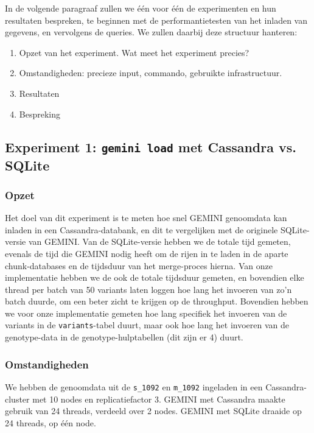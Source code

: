 In de volgende paragraaf zullen we \'e\'en voor \'e\'en de experimenten en hun resultaten bespreken, te beginnen met de performantietesten van het inladen van gegevens, en vervolgens de queries. We zullen daarbij deze structuur hanteren:
\begin{enumerate}
\item Opzet van het experiment. Wat meet het experiment precies?
\item Omstandigheden: precieze input, commando, gebruikte infrastructuur.
\item Resultaten
\item Bespreking
\end{enumerate}

\subsection{Experiment 1: \texttt{gemini load} met Cassandra vs. SQLite}
\label{exp1}

\subsubsection{Opzet}

Het doel van dit experiment is te meten hoe snel GEMINI genoomdata kan inladen in een Cassandra-databank, en dit te vergelijken met de originele SQLite-versie van GEMINI. Van de SQLite-versie hebben we de totale tijd gemeten, evenals de tijd die GEMINI nodig heeft om de rijen in te laden in de aparte chunk-databases en de tijdsduur van het merge-proces hierna. Van onze implementatie hebben we de ook de totale tijdsduur gemeten, en bovendien elke thread per batch van 50 variants laten loggen hoe lang het invoeren van zo'n batch duurde, om een beter zicht te krijgen op de throughput. Bovendien hebben we voor onze implementatie gemeten hoe lang specifiek het invoeren van de variants in de \texttt{variants}-tabel duurt, maar ook hoe lang het invoeren van de genotype-data in de genotype-hulptabellen (dit zijn er 4) duurt. 

\subsubsection{Omstandigheden}
We hebben de genoomdata uit de \texttt{s\_1092} en \texttt{m\_1092} ingeladen in een Cassandra-cluster met 10 nodes en replicatiefactor 3. GEMINI met Cassandra maakte gebruik van 24 threads, verdeeld over 2 nodes. GEMINI met SQLite draaide op 24 threads, op \'e\'en node.

